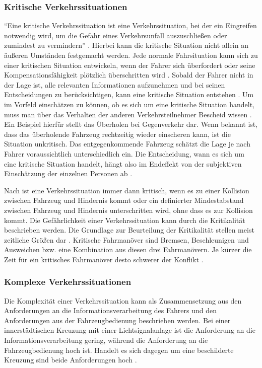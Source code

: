 \subsubsection{Kritische Verkehrssituationen}
\enquote{Eine kritische Verkehrssituation ist eine Verkehrssituation, bei der ein Eingreifen notwendig wird, um die Gefahr eines Verkehrsunfall auszuschließen oder zumindest zu vermindern} \parencite[S. 4]{MockHecker.1994}. Hierbei kann die kritische Situation nicht allein an äußeren Umständen festgemacht werden. Jede normale Fahrsituation kann sich zu einer kritischen Situation entwickeln, wenn der Fahrer sich überfordert oder seine Kompensationsfähigkeit plötzlich überschritten wird \parencite[S. 76]{Bock.1989}. Sobald der Fahrer nicht in der Lage ist, alle relevanten Informationen aufzunehmen und bei seinen Entscheidungen zu berücksichtigen, kann eine kritische Situation entstehen \parencite[S. 2]{Gerstenberger.17.02.2015}. Um im Vorfeld einschätzen zu können, ob es sich um eine kritische Situation handelt, muss man über das Verhalten der anderen Verkehrsteilnehmer Bescheid wissen \parencite[S. 3]{MockHecker.1994}. Ein Beispiel hierfür stellt das Überholen bei Gegenverkehr dar. Wenn bekannt ist, dass das überholende Fahrzeug rechtzeitig wieder einscheren kann, ist die Situation unkritisch. Das entgegenkommende Fahrzeug schätzt die Lage je nach Fahrer voraussichtlich unterschiedlich ein. Die Entscheidung, wann es sich um eine kritische Situation handelt, hängt also im Endeffekt von der subjektiven Einschätzung der einzelnen Personen ab \parencite[S. 39]{Gerstenberger.17.02.2015}.

Nach \Textcite[S. 30]{Schmidt.2010} ist eine Verkehrssituation immer dann kritisch, wenn es zu einer Kollision zwischen Fahrzeug und Hindernis kommt oder ein definierter Mindestabstand zwischen Fahrzeug und Hindernis unterschritten wird, ohne dass es zur Kollision kommt. Die Gefährlichkeit einer Verkehrssituation kann durch die Kritikalität beschrieben werden. Die Grundlage zur Beurteilung der Kritikalität stellen meist zeitliche Größen dar \parencite[S. 39]{Gerstenberger.17.02.2015}. Kritische Fahrmanöver sind Bremsen, Beschleunigen und Ausweichen bzw. eine Kombination aus diesen drei Fahrmanövern. Je kürzer die Zeit für ein kritisches Fahrmanöver desto schwerer der Konflikt \parencite[S. 26]{Erke.1978}.

\subsubsection{Komplexe Verkehrssituationen}
Die Komplexität einer Verkehrssituation kann als Zusammensetzung aus den Anforderungen an die Informationsverarbeitung des Fahrers und den Anforderungen aus der Fahrzeugbedienung beschrieben werden. Bei einer innerstädtischen Kreuzung mit einer Lichtsignalanlage ist die Anforderung an die Informationsverarbeitung gering, während die Anforderung an die Fahrzeugbedienung hoch ist. Handelt es sich dagegen um eine beschilderte Kreuzung sind beide Anforderungen hoch \parencite[S. 36f]{Gerstenberger.17.02.2015}.


